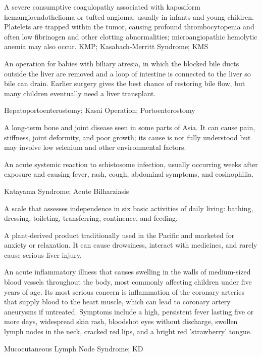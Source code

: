  A severe consumptive coagulopathy associated with kaposiform hemangioendothelioma or tufted angioma, usually in infants and young children. Platelets are trapped within the tumor, causing profound thrombocytopenia and often low fibrinogen and other clotting abnormalities; microangiopathic hemolytic anemia may also occur.
\synonyms
KMP; Kasabach-Merritt Syndrome; KMS

 An operation for babies with biliary atresia, in which the blocked bile ducts outside the liver are removed and a loop of intestine is connected to the liver so bile can drain. Earlier surgery gives the best chance of restoring bile flow, but many children eventually need a liver transplant.

\synonyms
Hepatoportoenterostomy; Kasai Operation; Portoenterostomy

 A long-term bone and joint disease seen in some parts of Asia. It can cause pain, stiffness, joint deformity, and poor growth; its cause is not fully understood but may involve low selenium and other environmental factors.

 An acute systemic reaction to schistosome infection, usually occurring weeks after exposure and causing fever, rash, cough, abdominal symptoms, and eosinophilia.

\synonyms
Katayama Syndrome; Acute Bilharziasis

 A scale that assesses independence in six basic activities of daily living: bathing, dressing, toileting, transferring, continence, and feeding.

 A plant-derived product traditionally used in the Pacific and marketed for anxiety or relaxation. It can cause drowsiness, interact with medicines, and rarely cause serious liver injury.

 An acute inflammatory illness that causes swelling in the walls of medium-sized blood vessels throughout the body, most commonly affecting children under five years of age. Its most serious concern is inflammation of the coronary arteries that supply blood to the heart muscle, which can lead to coronary artery aneurysms if untreated. Symptoms include a high, persistent fever lasting five or more days, widespread skin rash, bloodshot eyes without discharge, swollen lymph nodes in the neck, cracked red lips, and a bright red 'strawberry' tongue.

\synonyms
Mucocutaneous Lymph Node Syndrome; KD

